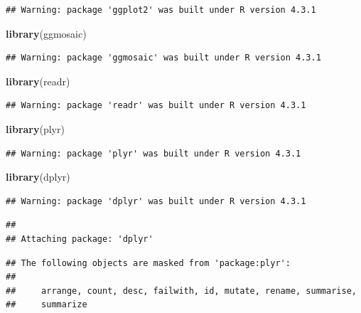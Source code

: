\documentclass[
]{article}
\newenvironment{Shaded}{\begin{snugshade}}{\end{snugshade}}
\newcommand{\FunctionTok}[1]{\textcolor[rgb]{0.13,0.29,0.53}{\textbf{#1}}}
\newcommand{\NormalTok}[1]{#1}
\begin{document}
\begin{verbatim}
## Warning: package 'ggplot2' was built under R version 4.3.1
\end{verbatim}

\begin{Shaded}
\begin{Highlighting}[]
\FunctionTok{library}\NormalTok{(ggmosaic)}
\end{Highlighting}
\end{Shaded}

\begin{verbatim}
## Warning: package 'ggmosaic' was built under R version 4.3.1
\end{verbatim}

\begin{Shaded}
\begin{Highlighting}[]
\FunctionTok{library}\NormalTok{(readr)}
\end{Highlighting}
\end{Shaded}

\begin{verbatim}
## Warning: package 'readr' was built under R version 4.3.1
\end{verbatim}

\begin{Shaded}
\begin{Highlighting}[]
\FunctionTok{library}\NormalTok{(plyr)}
\end{Highlighting}
\end{Shaded}

\begin{verbatim}
## Warning: package 'plyr' was built under R version 4.3.1
\end{verbatim}

\begin{Shaded}
\begin{Highlighting}[]
\FunctionTok{library}\NormalTok{(dplyr)}
\end{Highlighting}
\end{Shaded}

\begin{verbatim}
## Warning: package 'dplyr' was built under R version 4.3.1
\end{verbatim}

\begin{verbatim}
## 
## Attaching package: 'dplyr'
\end{verbatim}

\begin{verbatim}
## The following objects are masked from 'package:plyr':
## 
##     arrange, count, desc, failwith, id, mutate, rename, summarise,
##     summarize
\end{verbatim}
\end{document}
